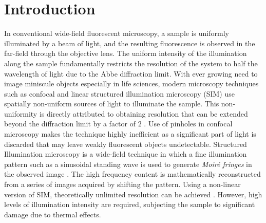 \documentclass[10pt]{article}
\renewcommand{\^}{\hat}  %
\renewcommand{\^}{\hat}  %
\begin{document}



%
%
%
%
%

\section{Introduction}
%
In conventional wide-field fluorescent microscopy, a sample is uniformly illuminated by a beam of light, and the resulting fluorescence is observed in the far-field through the objective lens. The uniform intensity of the illumination along the sample fundamentally restricts the resolution of the system to half the wavelength of light due to the Abbe diffraction limit. With ever growing need to image miniscule objects especially in life sciences, modern microscopy techniques such as confocal and linear structured illumination microscopy (SIM) use spatially non-uniform sources of light to illuminate the sample. This non-uniformity is directly attributed to obtaining resolution that can be extended beyond the diffraction limit by a factor of $2$ \cite{Minsky1988,Gustafsson2000}. Use of pinholes in confocal microscopy makes the technique highly inefficient as a significant part of light is discarded that may leave weakly fluorescent objects undetectable. Structured Illumination microscopy is a wide-field technique in which a fine illumination pattern such as a sinusoidal standing wave is used to generate \emph{Moiré fringes} in the
observed image \cite{Heintzmann1999, Heintzmann2006}. The high frequency content is mathematically reconstructed from a series of images acquired by shifting the pattern. Using a non-linear version of SIM, theoretically unlimited resolution can be achieved \cite{Gustafsson_2005}. However, high levels of illumination intensity are required, subjecting the sample to significant damage due to thermal effects.
\end{document}
